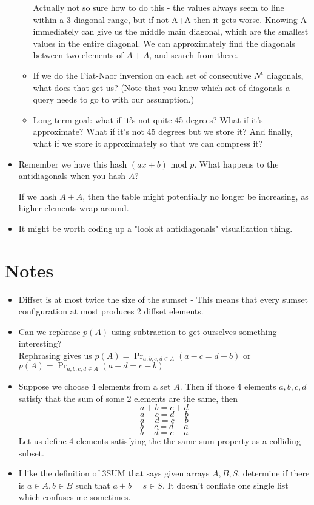 \documentclass{article}
\begin{document}
\begin{itemize}
\begin{itemize}
        Actually not so sure how to do this - the values always seem to line within a 3 diagonal range, but if not A+A then it gets worse. Knowing A immediately can give us the middle main diagonal, which are the smallest values in the entire diagonal. We can approximately find the diagonals between two elements of $A+A$, and search from there.
        
        \item If we do the Fiat-Naor inversion on each set of consecutive $N^{\epsilon}$ diagonals, what does that get us?  (Note that you know which set of diagonals a query needs to go to with our assumption.)
        \item Long-term goal: what if it's not quite 45 degrees?  What if it's approximate?  What if it's not 45 degrees but we store it?  And finally, what if we store it approximately so that we can compress it?
      \end{itemize}
  \item Remember we have this hash $(ax + b)$ mod $p$. What happens to the antidiagonals when you hash $A$?
  
  If we hash $A+A$, then the table might potentially no longer be increasing, as higher elements wrap around.
  \item It might be worth coding up a "look at antidiagonals" visualization thing.
\end{itemize}

\section{Notes}

\begin{itemize}
    \item Diffset is at most twice the size of the sumset - This means that every sumset configuration at most produces 2 diffset elements.
    \item Can we rephrase $p(A)$ using subtraction to get ourselves something interesting?\\
    Rephrasing gives us $p(A) = \Pr_{a,b,c,d \in A} (a-c = d-b)$ or $p(A) = \Pr_{a,b,c,d \in A} (a-d = c-b)$
    \item Suppose we choose 4 elements from a set $A$. Then if those 4 elements $a,b,c,d$ satisfy that the sum of some 2 elements are the same, then
    $$a+b = c+d$$
    $$a-c = d-b$$
    $$a-d = c-b$$
    $$b-c = d-a$$
    $$b-d = c-a$$
    Let us define 4 elements satisfying the the same sum property as a colliding subset.
    \item I like the definition of 3SUM that says given arrays $A,B,S$, determine if there is $a \in A, b \in B$ such that $a+b=s \in S$. It doesn't conflate one single list which confuses me sometimes.
\end{itemize}
\end{document}
